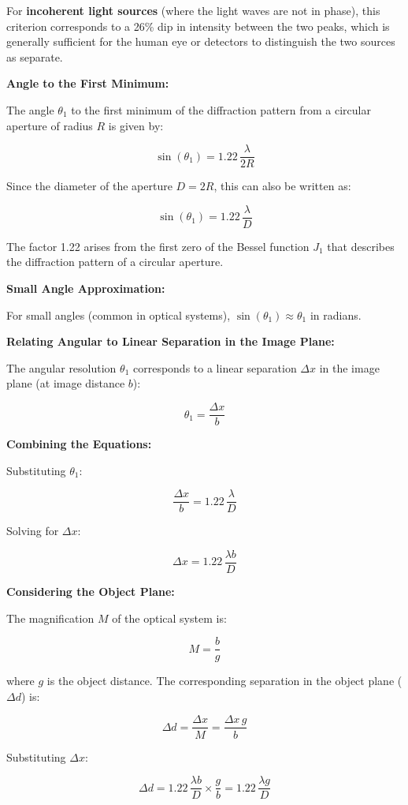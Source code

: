 \documentclass[
  a4paper,
]{book}
\begin{document}
For \textbf{incoherent light sources} (where the light waves are not in
phase), this criterion corresponds to a 26\% dip in intensity between
the two peaks, which is generally sufficient for the human eye or
detectors to distinguish the two sources as separate.

\textbf{Angle to the First Minimum:}

The angle \(\theta_1\) to the first minimum of the diffraction pattern
from a circular aperture of radius \(R\) is given by:

\[
   \sin(\theta_1) = 1.22\, \frac{\lambda}{2R}
   \]

Since the diameter of the aperture \(D = 2R\), this can also be written
as:

\[
   \sin(\theta_1) = 1.22\, \frac{\lambda}{D}
   \]

The factor 1.22 arises from the first zero of the Bessel function
\(J_1\) that describes the diffraction pattern of a circular aperture.

\textbf{Small Angle Approximation:}

For small angles (common in optical systems),
\(\sin(\theta_1) \approx \theta_1\) in radians.

\textbf{Relating Angular to Linear Separation in the Image Plane:}

The angular resolution \(\theta_1\) corresponds to a linear separation
\(\Delta x\) in the image plane (at image distance \(b\)):

\[
   \theta_1 = \frac{\Delta x}{b}
   \]

\textbf{Combining the Equations:}

Substituting \(\theta_1\):

\[
   \frac{\Delta x}{b} = 1.22\, \frac{\lambda}{D}
   \]

Solving for \(\Delta x\):

\[
   \Delta x = 1.22\, \frac{\lambda b}{D}
   \]

\textbf{Considering the Object Plane:}

The magnification \(M\) of the optical system is:

\[
   M = \frac{b}{g}
   \]

where \(g\) is the object distance. The corresponding separation in the
object plane (\(\Delta d\)) is:

\[
   \Delta d = \frac{\Delta x}{M} = \frac{\Delta x \, g}{b}
   \]

Substituting \(\Delta x\):

\[
   \Delta d = 1.22\, \frac{\lambda b}{D} \times \frac{g}{b} = 1.22\, \frac{\lambda g}{D}
   \]
\end{document}
